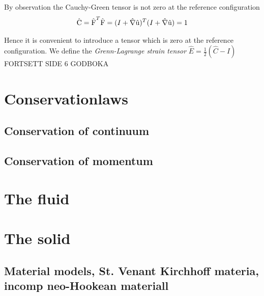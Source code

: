 By observation the Cauchy-Green tensor is not zero at the reference configuration 
\begin{align*}
\ha{C} =  \ha{F}^T \ha{F} = (I + \hat{\nabla} \ha{u})^T (I + \hat{\nabla} \ha{u}) = 1
\end{align*}

Hence it is convenient to introduce a tensor which is zero at the reference configuration. We define the \textit{Grenn-Lagrange strain tensor} 
$\hat{E} = \frac{1}{2}(\hat{C} - I) $ FORTSETT SIDE 6 GODBOKA
\section{Conservationlaws}
\subsection{Conservation of continuum}
\subsection{Conservation of momentum}

\section{The fluid}

\section{The solid}

\subsection{Material models, St. Venant Kirchhoff materia, incomp neo-Hookean materiall}


